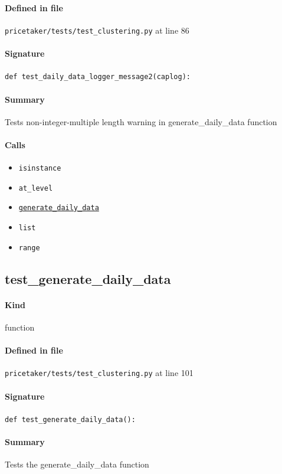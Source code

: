 \documentclass[11pt]{report}
\begin{document}
\paragraph{Defined in file} \texttt{pricetaker/tests/test\_clustering.py} at line 86
\paragraph{Signature} \texttt{def test\_daily\_data\_logger\_message2(caplog):}
\paragraph{Summary} Tests non-integer-multiple length warning in generate\_daily\_data function
\paragraph{Calls}
\begin{itemize}[leftmargin=*]
  \item \texttt{isinstance}
  \item \texttt{at\_level}
  \item \hyperref[def:pricetaker-clustering.py:generate_daily_data:L35]{\texttt{generate\_daily\_data}}
  \item \texttt{list}
  \item \texttt{range}
\end{itemize}
\subsection{test\_generate\_daily\_data}
\label{def:pricetaker-tests-test_clustering.py:test_generate_daily_data:L101}
\paragraph{Kind} function
\paragraph{Defined in file} \texttt{pricetaker/tests/test\_clustering.py} at line 101
\paragraph{Signature} \texttt{def test\_generate\_daily\_data():}
\paragraph{Summary} Tests the generate\_daily\_data function
\end{document}
